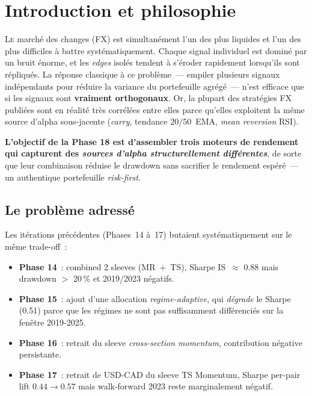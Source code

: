 \section{Introduction et philosophie}
\label{sec:intro}

\lettrine[lines=2, findent=2pt, nindent=0pt]{L}{e} marché des changes (FX) est simultanément l'un des plus liquides et l'un des plus difficiles à battre systématiquement. Chaque signal individuel est dominé par un bruit énorme, et les \emph{edges} isolés tendent à s'éroder rapidement lorsqu'ils sont répliqués. La réponse classique à ce problème~--- empiler plusieurs signaux indépendants pour réduire la variance du portefeuille agrégé~--- n'est efficace que si les signaux sont \textbf{vraiment orthogonaux}. Or, la plupart des stratégies FX publiées sont en réalité très corrélées entre elles parce qu'elles exploitent la même source d'alpha sous-jacente (\emph{carry}, tendance $20/50$~EMA, \emph{mean reversion} RSI).

\begin{thesisbox}
\textbf{L'objectif de la Phase 18 est d'assembler trois moteurs de rendement qui capturent des \emph{sources d'alpha structurellement différentes}}, de sorte que leur combinaison réduise le drawdown sans sacrifier le rendement espéré~--- un authentique portefeuille \emph{risk-first}.
\end{thesisbox}

\subsection{Le problème adressé}

Les itérations précédentes (Phases~14 à~17) butaient systématiquement sur le même trade-off~:
\begin{itemize}
\item \textbf{Phase 14}~: combined $2$ sleeves (MR~+~TS), Sharpe IS~$\approx$ 0.88 mais drawdown $>$ 20\,\% et 2019/2023 négatifs.
\item \textbf{Phase 15}~: ajout d'une allocation \emph{regime-adaptive}, qui \emph{dégrade} le Sharpe (0.51) parce que les régimes ne sont pas suffisamment différenciés sur la fenêtre 2019-2025.
\item \textbf{Phase 16}~: retrait du sleeve \emph{cross-section momentum}, contribution négative persistante.
\item \textbf{Phase 17}~: retrait de USD-CAD du sleeve TS Momentum, Sharpe per-pair lift $0.44\rightarrow 0.57$ mais walk-forward 2023 reste marginalement négatif.
\end{itemize}

